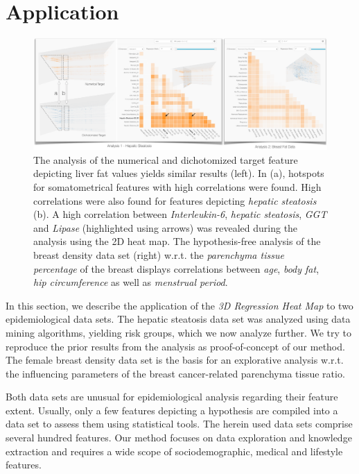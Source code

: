 \documentclass[journal]{style/vgtc} 			          %
\begin{document}
\section{Application} \label{application}
\begin{figure}[htb]
 \centering
 \includegraphics[width=1.0\linewidth]{figures/application}
 \caption{
 The analysis of the numerical and dichotomized target feature depicting liver fat values yields similar results (left).
 In (a), hotspots for somatometrical features with high correlations were found.
 High correlations were also found for features depicting \emph{hepatic steatosis} (b).
 A high correlation between \emph{Interleukin-6}, \emph{hepatic steatosis}, \emph{GGT} and \emph{Lipase} (highlighted using arrows) was revealed during the analysis using the 2D heat map.
 The hypothesis-free analysis of the breast density data set (right) w.r.t. the \emph{parenchyma tissue percentage} of the breast displays correlations between \emph{age}, \emph{body fat}, \emph{hip circumference} as well as \emph{menstrual period}.
 }
  \label{fig:Application}
\end{figure}
In this section, we describe the application of the \emph{3D Regression Heat Map} to two epidemiological data sets.
The hepatic steatosis data set was analyzed using data mining algorithms, yielding risk groups, which we now analyze further.
We try to reproduce the prior results from the analysis as proof-of-concept of our method.
The female breast density data set is the basis for an explorative analysis w.r.t. the influencing parameters of the breast cancer-related parenchyma tissue ratio.

Both data sets are unusual for epidemiological analysis regarding their feature extent.
Usually, only a few features depicting a hypothesis are compiled into a data set to assess them using statistical tools.
The herein used data sets comprise several hundred features.
Our method focuses on data exploration and knowledge extraction and requires a wide scope of sociodemographic, medical and lifestyle features.
\end{document}
